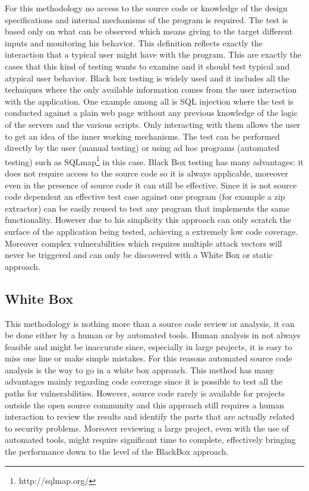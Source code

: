 \documentclass[../main.tex]{subfiles}
\begin{document}
For this methodology no access to the source code or knowledge of the design
specifications and internal mechanisms of the program is required. The test is
based only on what can be observed which means giving to the target different
inputs and monitoring his behavior. This definition reflects exactly the
interaction that a typical user might have with the program. This are exactly
the cases that this kind of testing wants to examine and it should test typical
and atypical user behavior. Black box testing is widely used and it includes
all the techniques where the only available information comes from the user
interaction with the application. One example among all is SQL injection where
the test is conducted against a plain web page without any previous knowledge of
the logic of the servers and the various scripts. Only interacting with them
allows the user to get an idea of the inner working mechanisms. The test can be
performed directly by the user (manual testing) or using ad hoc programs
(automated testing) such as SQLmap\footnote{http://sqlmap.org/} in this case.
Black Box testing has many advantages: it does not require access to the source
code so it is always applicable, moreover even in the presence of source code it
can still be effective. Since it is not source code dependent an effective test
case against one program (for example a zip extractor) can be easily reused to
test any program that implements the same functionality. However due to his
simplicity this approach can only scratch the surface of the application being
tested, achieving a extremely low code coverage. Moreover complex
vulnerabilities which requires multiple attack vectors will never be triggered
and can only be discovered with a White Box or static approach.

\subsection{White Box}

This methodology is nothing more than a source code review or analysis, it can
be done either by a human or by automated tools. Human analysis in not always
feasible and might be inaccurate since, especially in large projects, it is easy
to miss one line or make simple mistakes. For this reasons automated source code
analysis is the way to go in a white box approach. This method has many
advantages mainly regarding code coverage since it is possible to test all the
paths for vulnerabilities. However, source code rarely is available for projects
outside the open source community and this approach still requires a human
interaction to review the results and identify the parts that are actually
related to security problems. Moreover reviewing a large project, even with the
use of automated tools, might require significant time to complete, effectively
bringing the performance down to the level of the BlackBox approach.
\end{document}
